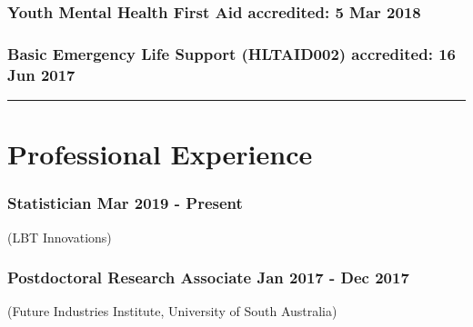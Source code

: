 \documentclass[a4paper,12pt]{report}
\begin{document}
\subsubsection*{Youth Mental Health First Aid \hfill accredited: 5 Mar 2018}

%
%

\subsubsection*{Basic Emergency Life Support (HLTAID002) \hfill accredited: 16 Jun 2017}





\vspace{0.2cm}
\hrule
\vspace{0.5cm}

\section*{Professional Experience}

\subsubsection*{Statistician  \hfill Mar 2019 - Present} \vspace{-6pt}
(LBT Innovations) \\[4pt]
\vspace{-0.7cm}

\subsubsection*{Postdoctoral Research Associate  \hfill Jan 2017 - Dec 2017} \vspace{-6pt}
(Future Industries Institute, University of South Australia) \\[4pt]
\vspace{-0.7cm}
\end{document}
